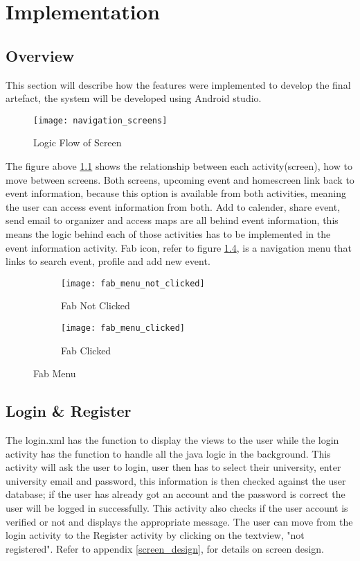\chapter{Implementation}
\section{Overview}
This section will describe how the features were implemented to develop the final artefact, the system will be developed using Android studio. 

\begin{figure}[h!]
	\centering       
	\texttt{[image: navigation\_screens]}
	\caption{Logic Flow of Screen}
	\label{fig:navigation_screen}	
\end{figure}
The figure above \ref{fig:navigation_screen} shows the relationship between each activity(screen), how to move between screens.
Both screens, upcoming event and homescreen link back to event information, because this option is available from both activities, meaning the user can access event information from both.
Add to calender, share event, send email to organizer and access maps are all behind event information, this means the logic behind each of those activities has to be implemented in the event information activity.
Fab icon, refer to figure \ref{fig:fab_menu}, is a navigation menu that links to search event, profile and add new event.
\begin{figure}
	\centering
	\begin{subfigure}[b!]{0.25\textwidth}  	      
		\texttt{[image: fab\_menu\_not\_clicked]}
		\caption{Fab Not Clicked}
		\label{fig:fab_not_clicked}
	\end{subfigure}%
	\begin{subfigure}[b!]{0.25\textwidth}	
		\texttt{[image: fab\_menu\_clicked]}
		\caption{Fab Clicked}
		\label{fig:xml_editor}
	\end{subfigure}
	\caption{Fab Menu}\label{fig:fab_menu}
\end{figure}

\section{Login \& Register}
The login.xml has the function to display the views to the user while the login activity has the function to handle all the java logic in the background. This activity will ask the user to login, user then has to select their university, enter university email and password, this information is then checked against the user database; if the user has already got an account and the password is correct the user will be logged in successfully. This activity also checks if the user account is verified or not and displays the appropriate message. The user can move from the login activity to the Register activity by clicking on the textview, "not registered". Refer to appendix \ref{screen_design}, for details on screen design.

